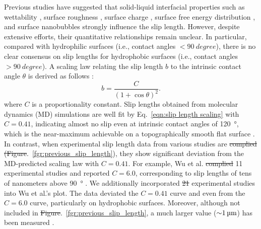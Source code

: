\documentclass[journal=jacsat,manuscript=article]{achemso}
\providecommand{\DIFadd}[1]{{\protect\color{blue}\uwave{#1}}} %
\providecommand{\DIFdel}[1]{{\protect\color{red}\sout{#1}}} %
\providecommand{\DIFaddbegin}{} %
\providecommand{\DIFaddend}{} %
\providecommand{\DIFdelbegin}{} %
\providecommand{\DIFdelend}{} %
\newcommand{\DIFscaledelfig}{0.5}
\newlength{\DIFdelgraphicswidth} %
\newlength{\DIFdelgraphicsheight} %
\newcommand{\DIFaddincludegraphics}[2][]{{\color{blue}\fbox{\DIFOincludegraphics[#1]{#2}}}} %
\newcommand{\DIFdelincludegraphics}[2][]{%
\sbox{\DIFdelgraphicsbox}{\DIFOincludegraphics[#1]{#2}}%
\settoboxwidth{\DIFdelgraphicswidth}{\DIFdelgraphicsbox} %
\settoboxtotalheight{\DIFdelgraphicsheight}{\DIFdelgraphicsbox} %
\scalebox{\DIFscaledelfig}{%
\parbox[b]{\DIFdelgraphicswidth}{\usebox{\DIFdelgraphicsbox}\\[-\baselineskip] \rule{\DIFdelgraphicswidth}{0em}}\llap{\resizebox{\DIFdelgraphicswidth}{\DIFdelgraphicsheight}{%
\setlength{\unitlength}{\DIFdelgraphicswidth}%
\begin{picture}(1,1)%
\thicklines\linethickness{2pt} %
{\color[rgb]{1,0,0}\put(0,0){\framebox(1,1){}}}%
{\color[rgb]{1,0,0}\put(0,0){\line( 1,1){1}}}%
{\color[rgb]{1,0,0}\put(0,1){\line(1,-1){1}}}%
\end{picture}%
}\hspace*{3pt}}} %
} %
\DeclareRobustCommand{\DIFaddbegin}{\DIFOaddbegin \let\includegraphics\DIFaddincludegraphics} %
\DeclareRobustCommand{\DIFaddend}{\DIFOaddend \let\includegraphics\DIFOincludegraphics} %
\DeclareRobustCommand{\DIFdelbegin}{\DIFOdelbegin \let\includegraphics\DIFdelincludegraphics} %
\DeclareRobustCommand{\DIFdelend}{\DIFOaddend \let\includegraphics\DIFOincludegraphics} %
\begin{document}
Previous studies have suggested that solid-liquid interfacial properties such as wettability \cite{Huang2008-xu}, surface roughness \cite{Vinogradova2006-cw}, surface charge \cite{Xie2020-as}, surface free energy distribution \cite{Tocci2014-es}, and surface nanobubbles \cite{Li2016-ly} strongly influence the slip length. However, despite extensive efforts, their quantitative relationships remain unclear. In particular, compared with hydrophilic surfaces (i.e., contact angles \(< \SI{90}{degree}\)), there is no clear consensus on slip lengths for hydrophobic surfaces (i.e., contact angles \(> \SI{90}{degree}\)). A scaling law relating the slip length \(b\) to the intrinsic contact angle \(\theta\) is derived as follows \cite{Huang2008-xu}:
\begin{equation}
  b = \frac{C}{(1 + \cos \theta)^{2}}. \label{eqn:slip length scaling}
\end{equation}
where \(C\) is a proportionality constant. Slip lengths obtained from molecular dynamics (MD) simulations are well fit by Eq.~\ref{eqn:slip length scaling} with \(C = 0.41\), indicating almost no slip even at intrinsic contact angles of \SI{120}{\degree}, which is the near-maximum achievable on a topographically smooth flat surface \cite{Nishino1999-dk}. In contrast, when experimental slip length data from various studies are \DIFdelbegin \DIFdel{complied (Figure}\DIFdelend \DIFaddbegin \DIFadd{compiled (Fig}\DIFaddend .~\ref{fgr:previous_slip_length}), they show significant deviation from the MD-predicted scaling law with \(C = 0.41\). For example, Wu et al. \DIFdelbegin \DIFdel{complied }\DIFdelend \DIFaddbegin \DIFadd{compiled }\DIFaddend 11 experimental studies and reported $C=6.0$, corresponding to slip lengths of tens of nanometers above \SI{90}{\degree} \cite{Wu2016-vv}. We additionally incorporated \DIFdelbegin \DIFdel{21 }\DIFdelend \DIFaddbegin \DIFadd{14 }\DIFaddend experimental studies into Wu et al.'s plot. The data deviated \DIFaddbegin \DIFadd{from }\DIFaddend the $C=0.41$ curve and even from the $C=6.0$ curve, particularly on hydrophobic surfaces. Moreover, although not included in \DIFdelbegin \DIFdel{Figure}\DIFdelend \DIFaddbegin \DIFadd{Fig}\DIFaddend .~\ref{fgr:previous_slip_length}, a much larger value ($\SI{\sim1}{\micro\metre}$) has been measured \cite{Tretheway2002-et}.
\end{document}
